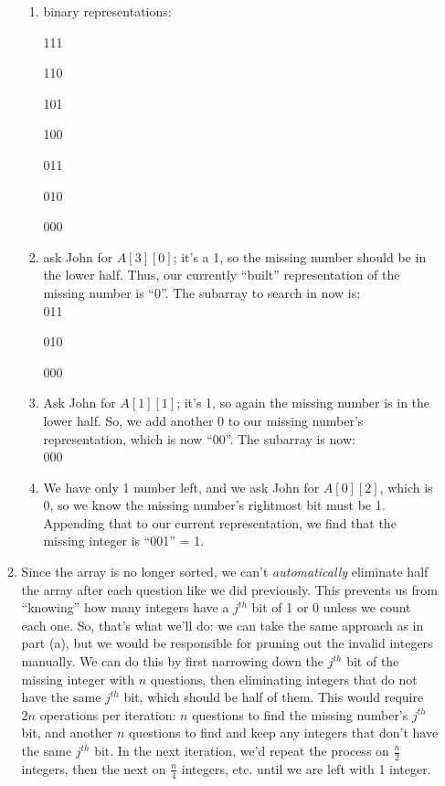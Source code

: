 \documentclass[12pt]{article}
\begin{document}
\begin{enumerate}
\begin{enumerate}
        \begin{enumerate}
            \item binary representations:
            
            111

            110

            101

            100

            011

            010

            000\\

            \item ask John for $A[3][0]$; it's a 1, so the missing number should be in the lower half. 
            Thus, our currently ``built'' representation of the missing number is ``0''. The subarray to search in now is:\\
            
            011

            010

            000\\

            \item Ask John for $A[1][1]$; it's 1, so again the missing number is in the lower half. So, we 
            add another 0 to our missing number's representation, which is now ``00''. The subarray is now:\\
            
            000\\

            \item We have only 1 number left, and we ask John for $A[0][2]$, which is 0, so we know the missing number's rightmost bit must 
            be 1. Appending that to our current representation, we find that the missing integer is ``001'' = 1.

        \end{enumerate}

        \item Since the array is no longer sorted, we can't \textit{automatically} eliminate half the array after each question like we did previously. 
        This prevents us from ``knowing'' how many integers have a $j^{th}$ bit of 1 or 0 unless we count each one. So, that's what 
        we'll do: we can take the same approach as in part (a), but we would be responsible for pruning out the invalid integers 
        manually. We can do this by first narrowing down the $j^{th}$ bit of the missing integer with $n$ questions, then eliminating 
        integers that do not have the same $j^{th}$ bit, which should be half of them. This would require $2n$ operations 
        per iteration: $n$ questions to find the missing number's $j^{th}$ bit, and another $n$ questions to find and keep
        any integers that don't have the same $j^{th}$ bit. In the next iteration, we'd repeat the process on $\frac{n}{2}$ 
        integers, then the next on $\frac{n}{4}$ integers, etc. until we are left with 1 integer.


\end{enumerate}
\end{enumerate}
\end{document}
